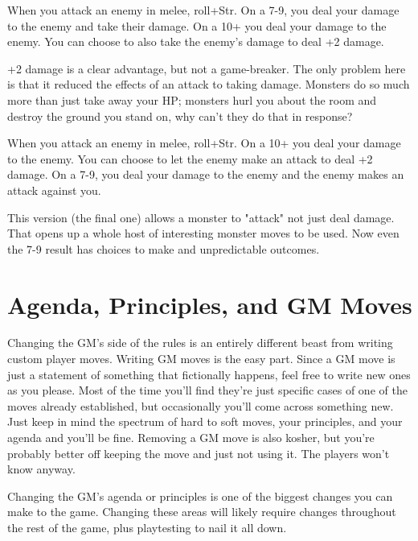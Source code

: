        
\startExample
When you attack an enemy in melee, roll+Str. On a 7-9, you deal your damage to the enemy and take their damage. On a 10+ you deal your damage to the enemy. You can choose to also take the enemy's damage to deal +2 damage.
\stopExample
       

+2 damage is a clear advantage, but not a game-breaker. The only problem here is that it reduced the effects of an attack to taking damage. Monsters do so much more than just take away your HP; monsters hurl you about the room and destroy the ground you stand on, why can't they do that in response?

       
\startExample
When you attack an enemy in melee, roll+Str. On a 10+ you deal your damage to the enemy. You can choose to let the enemy make an attack to deal +2 damage. On a 7-9, you deal your damage to the enemy and the enemy makes an attack against you.
\stopExample
       

This version (the final one) allows a monster to "attack" not just deal damage. That opens up a whole host of interesting monster moves to be used. Now even the 7-9 result has choices to make and unpredictable outcomes.

       
\section{Agenda, Principles, and GM Moves}      
       

Changing the GM's side of the rules is an entirely different beast from writing custom player moves. Writing GM moves is the easy part. Since a GM move is just a statement of something that fictionally happens, feel free to write new ones as you please. Most of the time you'll find they're just specific cases of one of the moves already established, but occasionally you'll come across something new. Just keep in mind the spectrum of hard to soft moves, your principles, and your agenda and you'll be fine. Removing a GM move is also kosher, but you're probably better off keeping the move and just not using it. The players won't know anyway.

       

Changing the GM's agenda or principles is one of the biggest changes you can make to the game. Changing these areas will likely require changes throughout the rest of the game, plus playtesting to nail it all down.

       

